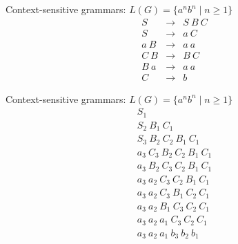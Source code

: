\documentclass[landscape]{slides}
\def\dbend{{\manual\char127}}   %
\begin{document}
\begin{slide}{\dbend\ Context-sensitive grammars: $L(G) = \{a^n b^n \mid n \geq 1 \}$}
\begin{eqnarray}
S &\rightarrow& S\ B\ C \nonumber \\
S &\rightarrow& a\ C \nonumber \\
a\ B &\rightarrow& a\ a \nonumber \\
C\ B &\rightarrow& B\ C \nonumber \\
B\ a &\rightarrow& a\ a \nonumber \\
C &\rightarrow& b \nonumber 
\end{eqnarray}
\end{slide}

\begin{slide}{\dbend\ Context-sensitive grammars: $L(G) = \{a^n b^n \mid n \geq 1 \}$}
\[ \begin{array}{r}
S_1 \\
S_2\ B_1\ C_1 \\
S_3\ B_2\ C_2\ B_1\ C_1 \\
a_3\ C_3\ B_2\ C_2\ B_1\ C_1 \\
a_3\ B_2\ C_3\ C_2\ B_1\ C_1 \\
a_3\ a_2\ C_3\ C_2\ B_1\ C_1 \\
a_3\ a_2\ C_3\ B_1\ C_2\ C_1 \\
a_3\ a_2\ B_1\ C_3\ C_2\ C_1 \\
a_3\ a_2\ a_1\ C_3\ C_2\ C_1 \\
a_3\ a_2\ a_1\ b_3\ b_2\ b_1
\end{array} \]
\end{slide}

\end{document}
